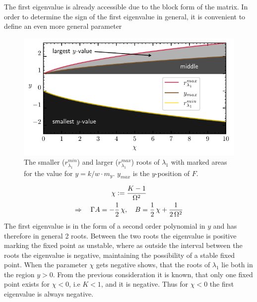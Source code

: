 The first eigenvalue is already accessible due to the block form of the matrix. In order to determine the sign of the first eigenvalue in general, it is convenient to define an even more general parameter
\begin{figure}[H]
    \centering
    \includegraphics{pictures/sign_of_ev1_streched.pdf}
    \caption{The smaller ($r_{\lambda_1}^{min}$) and larger ($r_{\lambda_1}^{max}$) roots of $\lambda_1$ with marked areas for the value for ${y}=k/w\cdot m_y$. ${y}_{max}$ is the ${y}$-position of $F$.}
    \label{fig:sign_lam1}
\end{figure}
\begin{gather*}
    \chi\vcentcolon=\frac{K-1}{\Omega^2}\\
    \Rightarrow\quad\Gamma A=-\half\,\chi,\quad
    B=\half\,\chi+\frac{1}{2\,\Omega^2}%
\end{gather*}
The first eigenvalue is in the form of a second order polynomial in $y$ and has therefore in general 2 roots. Between the two roots the eigenvalue is positive marking the fixed point as unstable, where as outside the interval between the roots the eigenvalue is negative, maintaining the possibility of a stable fixed point. When the parameter $\chi$ gets negative  shows, that the roots of $\lambda_1$ lie both in the region $y>0$. From the previous consideration it is known, that only one fixed point exists for $\chi<0$, i.e $K<1$, and it is negative. Thus for $\chi<0$ the first eigenvalue is always negative.\\\\
